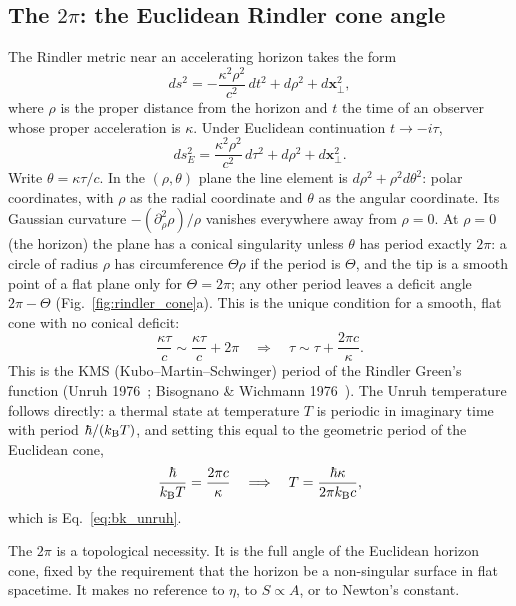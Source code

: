 \subsection{The $2\pi$: the Euclidean Rindler cone angle}\label{sec:bk_twopi}
The Rindler metric near an accelerating horizon takes the form
\begin{equation}
ds^2=-\frac{\kappa^2\rho^2}{c^2}\,dt^2+d\rho^2+d\mathbf x_\perp^2,\label{eq:bk_rindler}
\end{equation}
where $\rho$ is the proper distance from the horizon and $t$ the time of an observer whose proper acceleration is $\kappa$. Under Euclidean
continuation $t\to-i\tau$,
\begin{equation}
ds^2_E=\frac{\kappa^2\rho^2}{c^2}\,d\tau^2+d\rho^2+d\mathbf x_\perp^2.\label{eq:bk_euclid}
\end{equation}
Write $\theta=\kappa\tau/c$. In the $(\rho,\theta)$ plane the line element is $d\rho^2+\rho^2d\theta^2$: polar coordinates, with $\rho$ as the radial coordinate
and $\theta$ as the angular coordinate. Its Gaussian curvature $-(\partial_\rho^2\rho)/\rho$ vanishes everywhere away from $\rho=0$. At $\rho=0$ (the horizon) the
plane has a conical singularity unless $\theta$ has period exactly $2\pi$: a circle of radius $\rho$ has circumference $\Theta\rho$ if the period is $\Theta$,
and the tip is a smooth point of a flat plane only for $\Theta=2\pi$; any other period leaves a deficit angle $2\pi-\Theta$ (Fig.~\ref{fig:rindler_cone}a). This is the
unique condition for a smooth, flat cone with no conical deficit:
\begin{equation}
\frac{\kappa\tau}{c}\sim\frac{\kappa\tau}{c}+2\pi\quad\Longrightarrow\quad\tau\sim\tau+\frac{2\pi c}{\kappa}.\label{eq:bk_period}
\end{equation}
This is the KMS (Kubo--Martin--Schwinger) period of the Rindler Green's function (Unruh 1976~\cite{Unruh1976}; Bisognano \& Wichmann 1976~\cite{BisognanoWichmann1976}). The
Unruh temperature follows directly: a thermal state at temperature $T$ is periodic in imaginary time with period $\hbar/(k_{\mathrm B} T)$, and setting this equal to the
geometric period of the Euclidean cone,
\begin{equation}
\frac{\hbar}{k_{\mathrm B} T}=\frac{2\pi c}{\kappa}\quad\Longrightarrow\quad T=\frac{\hbar\kappa}{2\pi k_{\mathrm B} c},
\end{equation}
which is Eq.~\eqref{eq:bk_unruh}. \derived

The $2\pi$ is a topological necessity. It is the full angle of the Euclidean horizon cone, fixed by the requirement that the horizon be a non-singular
surface in flat spacetime. It makes no reference to $\eta$, to $S\propto A$, or to Newton's constant. \derived

